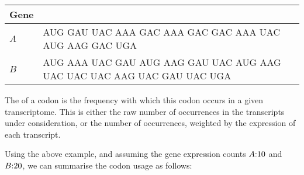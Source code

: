 \begin{table}[H]
    \centering
    \begin{tabu} to 
        \toprule
        Gene &  \\
        \midrule
        \(A\) & AUG GAU UAC AAA GAC AAA GAC GAC AAA UAC AUG AAG GAC UGA \\
        \(B\) & AUG AAA UAC GAU AUG AAG GAU UAC AUG AAG UAC UAC UAC AAG UAC GAU UAC UGA \\
        \bottomrule
    \end{tabu}
\end{table}

The  of a codon is the frequency with which this codon
occurs in a given transcriptome. This is either the raw number of occurrences in
the transcripts under consideration, or the number of occurrences, weighted by
the expression of each transcript.

Using the above example, and assuming the gene expression counts \(A\text: 10\)
and \(B\text: 20\), we can summarise the codon usage as follows:

